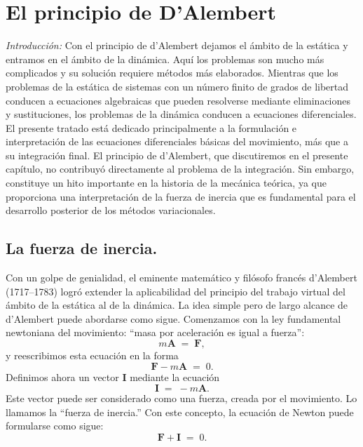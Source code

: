 \documentclass[12pt,a4paper]{book}
\begin{document}
\chapter{El principio de D'Alembert}

\textit{Introducción:} Con el principio de d'Alembert dejamos el ámbito de la estática y entramos en el ámbito de la dinámica. Aquí los problemas son mucho más complicados y su solución requiere métodos más elaborados. Mientras que los problemas de la estática de sistemas con un número finito de grados de libertad conducen a ecuaciones algebraicas que pueden resolverse mediante eliminaciones y sustituciones, los problemas de la dinámica conducen a ecuaciones diferenciales. El presente tratado está dedicado principalmente a la formulación e interpretación de las ecuaciones diferenciales básicas del movimiento, más que a su integración final. El principio de d'Alembert, que discutiremos en el presente capítulo, no contribuyó directamente al problema de la integración. Sin embargo, constituye un hito importante en la historia de la mecánica teórica, ya que proporciona una interpretación de la fuerza de inercia que es fundamental para el desarrollo posterior de los métodos variacionales.

\section{La fuerza de inercia.}

Con un golpe de genialidad, el eminente matemático y filósofo francés d'Alembert (1717--1783) logró extender la aplicabilidad del principio del trabajo virtual del ámbito de la estática al de la dinámica. La idea simple pero de largo alcance de d'Alembert puede abordarse como sigue. Comenzamos con la ley fundamental newtoniana del movimiento: ``masa por aceleración es igual a fuerza'':
\begin{equation}
m\mathbf{A} \;=\; \mathbf{F}, \tag{41.1}
\end{equation}
y reescribimos esta ecuación en la forma
\begin{equation}
\mathbf{F} - m\mathbf{A} \;=\; 0. \tag{41.2}
\end{equation}
Definimos ahora un vector $\mathbf{I}$ mediante la ecuación
\begin{equation}
\mathbf{I} \;=\; -m\mathbf{A}. \tag{41.3}
\end{equation}
Este vector puede ser considerado como una fuerza, creada por el movimiento. Lo llamamos la ``fuerza de inercia.'' Con este concepto, la ecuación de Newton puede formularse como sigue:
\begin{equation}
\mathbf{F} + \mathbf{I} \;=\; 0. \tag{41.4}
\end{equation}
\end{document}
